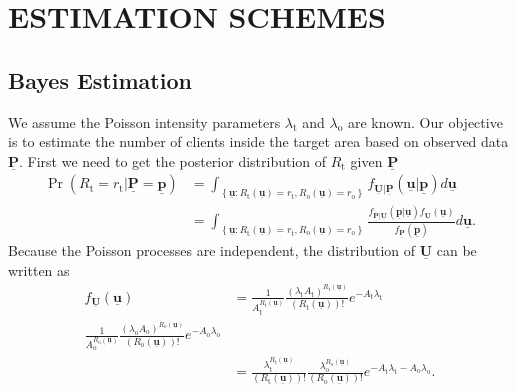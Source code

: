 \chapter{ESTIMATION SCHEMES}


\section{Bayes Estimation}

We assume the Poisson intensity parameters $\lambda_{\mathrm{t}}$ and $\lambda_{\mathrm{o}}$ are known. Our objective is to estimate the number of clients inside the target area based on observed data $\underline{\mathbf{P}}$. First we need to get the posterior distribution of $R_{\mathrm{t}}$ given $\underline{\mathbf{P}}$
\begin{equation} \label{equation:PosdistRt}
\begin{split}
\Pr \left( R_{\mathrm{t}} = r_{\mathrm{t}}
| \underline{\mathbf{P}} = \underline{\mathbf{p}} \right)
&= \int_{ \left\{ \underline{\mathbf{u}}
	: R_{\mathrm{t}}(\underline{\mathbf{u}}) = r_{\mathrm{t}},
	R_{\mathrm{o}}(\underline{\mathbf{u}}) = r_{\mathrm{o}}
	\right\} }
f_{\underline{\mathbf{U}} | \underline{\mathbf{P}}}
\left( \underline{\mathbf{u}} | \underline{\mathbf{p}} \right)
d\underline{\mathbf{u}} \\
&= \int_{ \left\{ \underline{\mathbf{u}}
	: R_{\mathrm{t}}(\underline{\mathbf{u}}) = r_{\mathrm{t}},
	R_{\mathrm{o}}(\underline{\mathbf{u}}) = r_{\mathrm{o}} \right\} }
\frac{ f_{\underline{\mathbf{P}} | \underline{\mathbf{U}}}
	\left( \underline{\mathbf{p}} | \underline{\mathbf{u}} \right)
	f_{\underline{\mathbf{U}}} (\underline{\mathbf{u}}) }
{ f_{\underline{\mathbf{P}}} \left( \underline{\mathbf{p}} \right) }
d\underline{\mathbf{u}} .
\end{split}
\end{equation}
Because the Poisson processes are independent, the distribution of $\underline{\mathbf{U}}$ can be written as
\begin{equation} \label{equation:distU}
\begin{split}
f_{\underline{\mathbf{U}}} ( \underline{\mathbf{u}} )
&= \frac{1}{A_{\mathrm{t}}^{R_{\mathrm{t}}(\underline{\mathbf{u}})}}
\frac{ ( \lambda_{\mathrm{t}}
	A_{\mathrm{t}} )^{R_{\mathrm{t}}(\underline{\mathbf{u}})} }
{ ( R_{\mathrm{t}}(\underline{\mathbf{u}}) )! }
e^{- A_{\mathrm{t}} \lambda_{\mathrm{t}}} \\
\frac{1}{A_{\mathrm{o}}^{R_{\mathrm{o}}(\underline{\mathbf{u}})}}
\frac{ ( \lambda_{\mathrm{o}}
	A_{\mathrm{o}} )^{R_{\mathrm{o}}(\underline{\mathbf{u}})} }
{ ( R_{\mathrm{o}}(\underline{\mathbf{u}}) )! }
e^{- A_{\mathrm{o}} \lambda_{\mathrm{o}}} \\
&= \frac{ \lambda_{\mathrm{t}}^{R_{\mathrm{t}}(\underline{\mathbf{u}})} }
{ ( R_{\mathrm{t}}(\underline{\mathbf{u}}) )! }
\frac{ \lambda_{\mathrm{o}}^{R_{\mathrm{o}}(\underline{\mathbf{u}})} }
{ ( R_{\mathrm{o}}(\underline{\mathbf{u}}) )! }
e^{- A_{\mathrm{t}} \lambda_{\mathrm{t}}
	- A_{\mathrm{o}} \lambda_{\mathrm{o}}} .
\end{split}
\end{equation}
